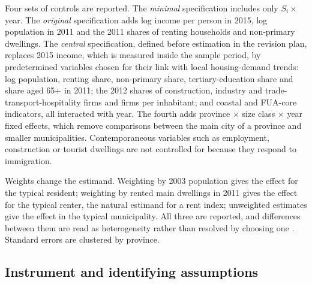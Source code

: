 \documentclass[11pt,a4paper]{article}
\begin{document}
Four sets of controls are reported. The \emph{minimal} specification includes only $S_i\times$ year. The \emph{original} specification adds log income per person in 2015, log population in 2011 and the 2011 shares of renting households and non-primary dwellings. The \emph{central} specification, defined before estimation in the revision plan, replaces 2015 income, which is measured inside the sample period, by predetermined variables chosen for their link with local housing-demand trends: log population, renting share, non-primary share, tertiary-education share and share aged 65+ in 2011; the 2012 shares of construction, industry and trade-transport-hospitality firms and firms per inhabitant; and coastal and FUA-core indicators, all interacted with year. The fourth adds province $\times$ size class $\times$ year fixed effects, which remove comparisons between the main city of a province and smaller municipalities. Contemporaneous variables such as employment, construction or tourist dwellings are not controlled for because they respond to immigration.

Weights change the estimand. Weighting by 2003 population gives the effect for the typical resident; weighting by rented main dwellings in 2011 gives the effect for the typical renter, the natural estimand for a rent index; unweighted estimates give the effect in the typical municipality. All three are reported, and differences between them are read as heterogeneity rather than resolved by choosing one \citep{solon2015}. Standard errors are clustered by province.

\subsection{Instrument and identifying assumptions}\label{sec:instrument}
\end{document}
